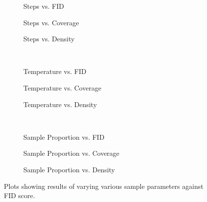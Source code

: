 \begin{figure}
    \centering
    \begin{subfigure}[b]{0.33\textwidth}
        \centering
        \resizebox{\textwidth}{!}{
            
        }
        \caption{Steps vs. FID}
    \end{subfigure}
    \hfill
    \begin{subfigure}[b]{0.33\textwidth}
        \centering
        \resizebox{\textwidth}{!}{
            
        }
        \caption{Steps vs. Coverage}
    \end{subfigure}
    \hfill
    \begin{subfigure}[b]{0.33\textwidth}
        \centering
        \resizebox{\textwidth}{!}{
            
        }
        \caption{Steps vs. Density}
    \end{subfigure}
    \\
    \begin{subfigure}[b]{0.33\textwidth}
        \centering
        \resizebox{\textwidth}{!}{
            
        }
        \caption{Temperature vs. FID}
    \end{subfigure}
    \hfill
    \begin{subfigure}[b]{0.33\textwidth}
        \centering
        \resizebox{\textwidth}{!}{
            
        }
        \caption{Temperature vs. Coverage}
    \end{subfigure}
    \hfill
    \begin{subfigure}[b]{0.33\textwidth}
        \centering
        \resizebox{\textwidth}{!}{
            
        }
        \caption{Temperature vs. Density}
    \end{subfigure}
    \\
    \begin{subfigure}[b]{0.33\textwidth}
        \centering
        \resizebox{\textwidth}{!}{
            
        }
        \caption{Sample Proportion vs. FID}
    \end{subfigure}
    \hfill
    \begin{subfigure}[b]{0.33\textwidth}
        \centering
        \resizebox{\textwidth}{!}{
            
        }
        \caption{Sample Proportion vs. Coverage}
    \end{subfigure}
    \hfill
    \begin{subfigure}[b]{0.33\textwidth}
        \centering
        \resizebox{\textwidth}{!}{
            
        }
        \caption{Sample Proportion vs. Density}
    \end{subfigure}
\caption{Plots showing results of varying various sample parameters against FID
score.}
\end{figure}

